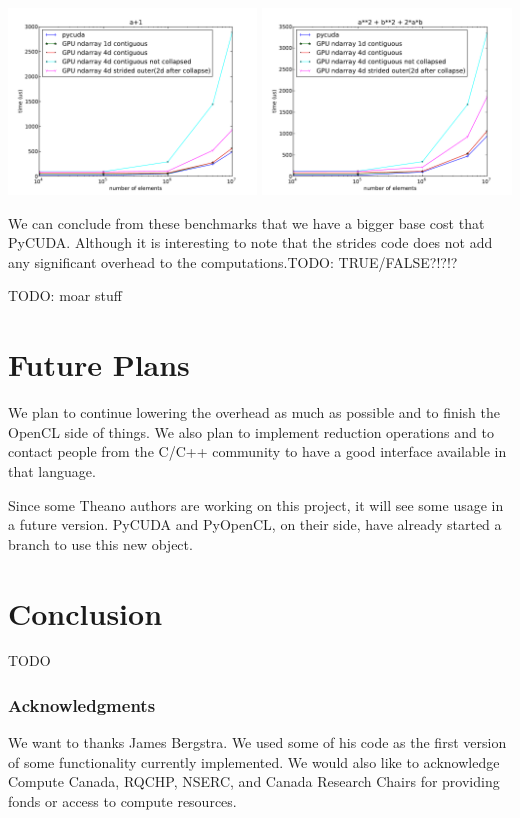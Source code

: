 \documentclass{article} %
\begin{document}
\includegraphics[width=0.495\textwidth]{ap1_no_alloc}
\includegraphics[width=0.495\textwidth]{a2pb2p2ab_no_alloc}

We can conclude from these benchmarks that we have a bigger base cost that PyCUDA.
Although it is interesting to note that the strides code does not add any significant overhead to the computations.TODO: TRUE/FALSE?!?!?

TODO: moar stuff

\section{Future Plans}

We plan to continue lowering the overhead as much as possible and to finish the OpenCL side of things.
We also plan to implement reduction operations and to contact people from the C/C++ community to have a good interface available in
that language.

Since some Theano authors are working on this project, it will see some usage in a future version. PyCUDA and PyOpenCL, on their side, have already started a branch to use this new object.

\section{Conclusion}

TODO

\subsubsection*{Acknowledgments}

We want to thanks James Bergstra. We used some of his code as the first version of some functionality currently implemented. We would also like to acknowledge Compute Canada, RQCHP, NSERC, and Canada Research Chairs for providing fonds or access to compute resources.




\end{document}

